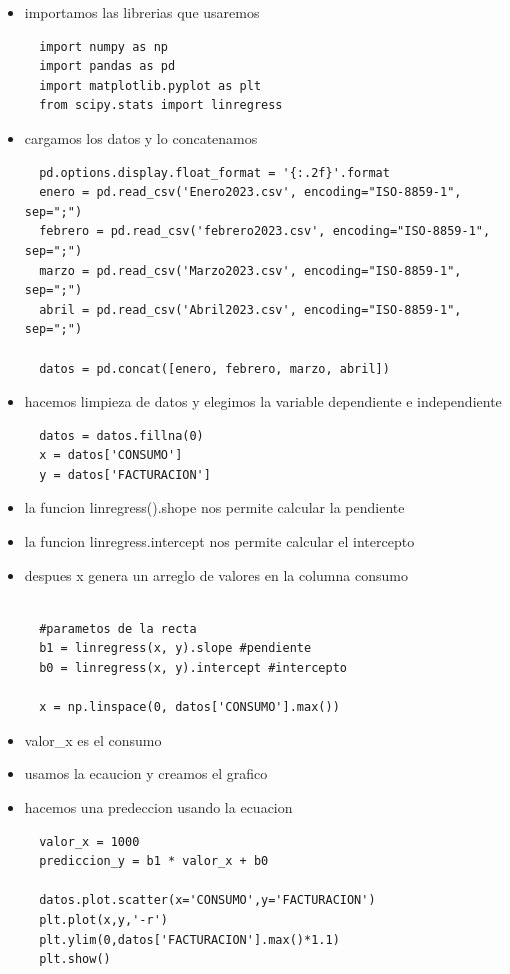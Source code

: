 \documentclass{article}
\begin{document}
\begin{itemize}

  \item importamos las librerias que usaremos
\begin{lstlisting}
  import numpy as np
  import pandas as pd
  import matplotlib.pyplot as plt
  from scipy.stats import linregress
\end{lstlisting}
\item cargamos los datos y lo concatenamos
\begin{lstlisting}
  pd.options.display.float_format = '{:.2f}'.format
  enero = pd.read_csv('Enero2023.csv', encoding="ISO-8859-1", sep=";")
  febrero = pd.read_csv('febrero2023.csv', encoding="ISO-8859-1", sep=";")
  marzo = pd.read_csv('Marzo2023.csv', encoding="ISO-8859-1", sep=";")
  abril = pd.read_csv('Abril2023.csv', encoding="ISO-8859-1", sep=";")

  datos = pd.concat([enero, febrero, marzo, abril])
\end{lstlisting}
\item hacemos limpieza de datos y elegimos la variable dependiente e independiente
\begin{lstlisting}
  datos = datos.fillna(0)
  x = datos['CONSUMO']
  y = datos['FACTURACION']

\end{lstlisting}
\item la funcion linregress().shope nos permite calcular la pendiente
\item la funcion linregress.intercept nos permite calcular el intercepto
\item despues x genera un arreglo de valores en la columna consumo
\begin{lstlisting}

  #parametos de la recta
  b1 = linregress(x, y).slope #pendiente
  b0 = linregress(x, y).intercept #intercepto
  
  x = np.linspace(0, datos['CONSUMO'].max())
\end{lstlisting}
\item valor\_x es el consumo 
\item usamos la ecaucion y creamos el grafico
\item hacemos una predeccion usando la ecuacion
\begin{lstlisting}
  valor_x = 1000 
  prediccion_y = b1 * valor_x + b0
  
  datos.plot.scatter(x='CONSUMO',y='FACTURACION')
  plt.plot(x,y,'-r')
  plt.ylim(0,datos['FACTURACION'].max()*1.1)
  plt.show()
\end{lstlisting}
\end{itemize}
\end{document}
